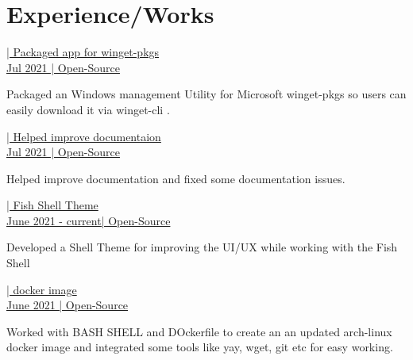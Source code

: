 \documentclass[]{deedy-resume-openfont}
\begin{document}
\begin{minipage}[t]{0.66\textwidth} 


\section{Experience/Works}

\href{https://github.com/microsoft/winget-pkgs/pull/19513}{| Packaged app for winget-pkgs }\\
\href{https://github.com/microsoft/winget-pkgs/pull/19513}{Jul 2021 | Open-Source}
\vspace{\topsep} %
\begin{tightemize}
\item Packaged an Windows management Utility for Microsoft winget-pkgs so users can easily download it via winget-cli .
\end{tightemize}
\sectionsep

\href{https://github.com/flameshot-org/flameshot}{| Helped improve documentaion }\\
\href{https://github.com/flameshot-org/flameshot}{Jul 2021 | Open-Source}
\vspace{\topsep} %
\begin{tightemize}
\item Helped improve documentation and fixed some documentation issues.
\end{tightemize}
\sectionsep


\href{https://github.com/creator54/mzish}{| Fish Shell Theme }\\
\href{https://github.com/creator54/mzish}{June 2021 - current| Open-Source}
\vspace{\topsep} %
\begin{tightemize}
\item Developed a Shell Theme for improving the UI/UX while working with the Fish Shell
\end{tightemize}
\sectionsep

\href{https://github.com/creator54/arch-latest}{| docker image }\\
\href{https://github.com/creator54/arch-latest}{June 2021 | Open-Source}
\vspace{\topsep} %
\begin{tightemize}
\item Worked with BASH SHELL and DOckerfile to create an an updated arch-linux docker image and integrated some tools like yay, wget, git etc for easy working.
\end{tightemize}
\sectionsep


\end{minipage}
\end{document}
